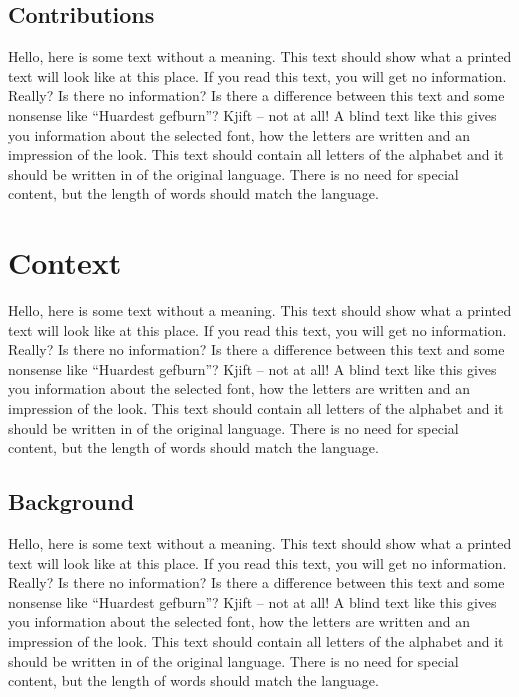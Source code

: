 \documentclass[%
  english,%
  todotools=true,%
  trtype=inproceedings%
]{hpitr}
\begin{document}
\subsection{Contributions}
\label{sec:contributions}

Hello, here is some text without a meaning. This text should show
what a printed text will look like at this place. If you read this
text, you will get no information. Really? Is there no information?
Is there a difference between this text and some nonsense like
“Huardest gefburn”? Kjift – not at all! A blind text like this gives
you information about the selected font, how the letters are written
and an impression of the look. This text should contain all letters
of the alphabet and it should be written in of the original
language. There is no need for special content, but the length of
words should match the language.

\section{Context}
\label{sec:context}

Hello, here is some text without a meaning. This text should show
what a printed text will look like at this place. If you read this
text, you will get no information. Really? Is there no information?
Is there a difference between this text and some nonsense like
“Huardest gefburn”? Kjift – not at all! A blind text like this gives
you information about the selected font, how the letters are written
and an impression of the look. This text should contain all letters
of the alphabet and it should be written in of the original
language. There is no need for special content, but the length of
words should match the language.


\subsection{Background}
\label{sec:background}

Hello, here is some text without a meaning. This text should show
what a printed text will look like at this place. If you read this
text, you will get no information. Really? Is there no information?
Is there a difference between this text and some nonsense like
“Huardest gefburn”? Kjift – not at all! A blind text like this gives
you information about the selected font, how the letters are written
and an impression of the look. This text should contain all letters
of the alphabet and it should be written in of the original
language. There is no need for special content, but the length of
words should match the language.
\end{document}
